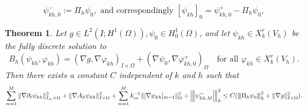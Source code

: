 \documentclass[10pt,a4paper]{amsart}
\newtheorem{theorem}{Theorem}
\newcommand{\IOprod}[1]{\left( #1 \right)_{I\times \Omega}}
\newcommand{\Om}{\Omega}
\newcommand{\Oprod}[1]{\left(#1\right)_{\Omega}}
\newcommand{\na}{\nabla}
\newcommand{\revB}[1]{\textcolor{black}{#1}}
\newcommand{\vertiii}[1]{{\left\vert\kern-0.25ex\left\vert\kern-0.25ex\left\vert #1
    \right\vert\kern-0.25ex\right\vert\kern-0.25ex\right\vert}}
\begin{document}
\begin{equation}\label{eq:jump_at_0_convention}
    \psi_{kh,0}^- := \Pi_h \psi_0, \text{ and correspondingly } [\psi_{kh}]_0 = \psi_{kh,0}^+ - \Pi_h \psi_0,
\end{equation}

\begin{theorem}\label{lem: stability fully}
  Let $g \in L^2(I;H^1(\Om)) ,\psi_0 \in H^1_0(\Om)$, and let $\psi_{kh} \in X^r_k(V_h)$ be the 
    fully discrete solution to
  \begin{equation}
      {B}_h(\psi_{kh},\varphi_{kh})=\IOprod{\nabla g, \nabla \varphi_{kh}}
      +\Oprod{\na \psi_0,\na \varphi_{kh,0}^+}
      \quad \text{for all $\varphi_{kh}\in X_{k}^r(V_h)$}.
  \end{equation}
  Then there exists a constant $C$ independent of $k$ and $h$ such that 
$$
\sum_{m=1}^M\|\na\partial_t \psi_{kh}\|^2_{I_m\times \Om}+\|\na A_h \psi_{kh}\|^2_{I\times \Om}+\sum_{m=1}^M k^{-1}_m\|[\na \psi_{kh}]_{m-1}\|^2_\Omega + \revB{\vertiii{\psi_{kh,M}^-}^2_h}\le C (\vertiii{\Pi_h \psi_0}^2_h + \|\na g\|^2_{I\times \Om}).
$$  
\end{theorem}
\end{document}

